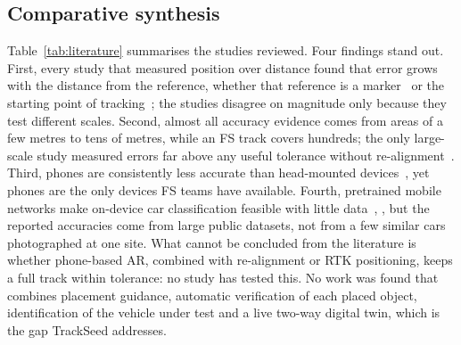 \subsection{Comparative synthesis}
Table~\ref{tab:literature} summarises the studies reviewed. Four findings stand out. First, every study that measured position over distance found that error grows with the distance from the reference, whether that reference is a marker~\cite{chalhoub2019} or the starting point of tracking~\cite{feigl2020}; the studies disagree on magnitude only because they test different scales. Second, almost all accuracy evidence comes from areas of a few metres to tens of metres, while an FS track covers hundreds; the only large-scale study measured errors far above any useful tolerance without re-alignment~\cite{feigl2020}. Third, phones are consistently less accurate than head-mounted devices~\cite{kim2025isarc}, yet phones are the only devices FS teams have available. Fourth, pretrained mobile networks make on-device car classification feasible with little data~\cite{yosinski2014}, \cite{sandler2018}, but the reported accuracies come from large public datasets, not from a few similar cars photographed at one site. What cannot be concluded from the literature is whether phone-based AR, combined with re-alignment or RTK positioning, keeps a full track within tolerance: no study has tested this. No work was found that combines placement guidance, automatic verification of each placed object, identification of the vehicle under test and a live two-way digital twin, which is the gap TrackSeed addresses.
